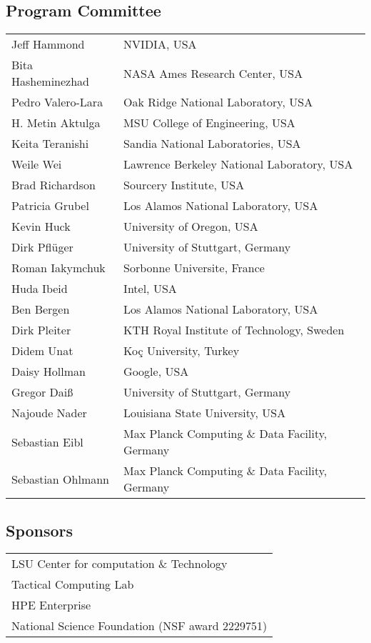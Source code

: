 \documentclass{llncs}
\begin{document}
\subsection*{Program Committee}
\begin{tabular}{@{}p{5cm}@{}p{7.2cm}@{}}
Jeff Hammond & NVIDIA, USA \\
Bita Hasheminezhad & NASA Ames Research Center, USA \\
Pedro Valero-Lara & Oak Ridge National Laboratory, USA
\\
H. Metin Aktulga & MSU College of Engineering, USA
\\
Keita Teranishi & Sandia National Laboratories, USA \\
Weile Wei & Lawrence Berkeley National Laboratory, USA\\
Brad Richardson & Sourcery Institute, USA \\
Patricia Grubel & Los Alamos National Laboratory, USA\\
Kevin Huck & University of Oregon, USA \\
Dirk Pflüger & University of Stuttgart, Germany \\
Roman Iakymchuk & Sorbonne Universite, France \\
Huda Ibeid & Intel, USA \\
Ben Bergen & Los Alamos National Laboratory, USA \\
Dirk Pleiter & KTH Royal Institute of Technology, Sweden \\
Didem Unat & Koç University, Turkey \\
Daisy Hollman & Google, USA \\
Gregor Daiß & University of Stuttgart,  Germany \\
Najoude Nader & Louisiana State University, USA \\
Sebastian Eibl &  Max Planck Computing \& Data Facility, Germany \\
Sebastian Ohlmann & Max Planck Computing \& Data Facility, Germany
\end{tabular}

\subsection*{Sponsors}
\begin{tabular}{@{}p{8cm}@{}@{}}
LSU Center for computation \& Technology \\
Tactical Computing Lab \\
HPE Enterprise \\
National Science Foundation (NSF award 2229751)

\end{tabular}
\end{document}
